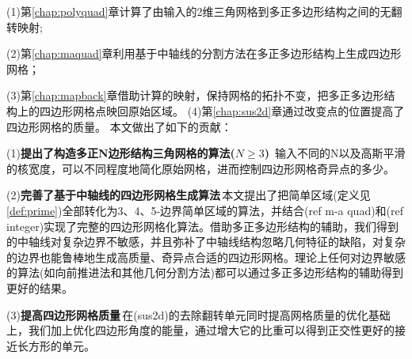 (1)第\ref{chap:polyquad}章计算了由输入的2维三角网格到多正多边形结构之间的无翻转映射;

(2)第\ref{chap:maquad}章利用基于中轴线的分割方法在多正多边形结构上生成四边形网格；

(3)第\ref{chap:mapback}章借助计算的映射，保持网格的拓扑不变，把多正多边形结构上的四边形网格点映回原始区域。%
(4)第\ref{chap:sus2d}章通过改变点的位置提高了四边形网格的质量。
本文做出了如下的贡献：

(1)\textbf{提出了构造多正N边形结构三角网格的算法($N \geq 3$)} \,输入不同的N以及高斯平滑的核宽度，可以不同程度地简化原始网格，进而控制四边形网格奇异点的多少。%

(2)\textbf{完善了基于中轴线的四边形网格生成算法}\,本文提出了把简单区域(定义见\ref{def:prime})全部转化为3、4、5-边界简单区域的算法，并结合(ref m-a quad)和(ref integer)实现了完整的四边形网格化算法。借助多正多边形结构的辅助，我们得到的中轴线对复杂边界不敏感，并且弥补了中轴线结构忽略几何特征的缺陷，对复杂的边界也能鲁棒地生成高质量、奇异点合适的四边形网格。理论上任何对边界敏感的算法(如向前推进法和其他几何分割方法)都可以通过多正多边形结构的辅助得到更好的结果。

(3)\textbf{提高四边形网格质量}\,在(sus2d)的去除翻转单元同时提高网格质量的优化基础上，我们加上优化四边形角度的能量，通过增大它的比重可以得到正交性更好的接近长方形的单元。
